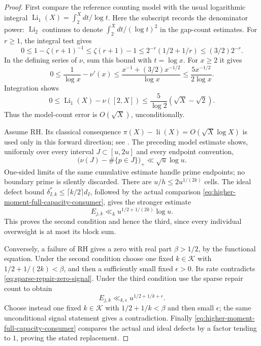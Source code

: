 \documentclass[11pt]{article}
\theoremstyle{definition}
\begin{document}
\begin{proof}
First compare the reference counting model with the usual
logarithmic integral $\operatorname{Li}_1(X)=\int_2^Xdt/\log t$.
Here the subscript records the denominator power: $\operatorname{Li}_2$
continues to denote $\int_2^Xdt/(\log t)^2$ in the gap-count estimates.
For $r\ge1$, the integral test gives
\[
 0\le1-\zeta(r+1)^{-1}
       \le\zeta(r+1)-1
       \le2^{-r}(1/2+1/r)\le(3/2)2^{-r}.
\]
In the defining series of $\nu$, sum this bound with
$t=\log x$. For $x\ge2$ it gives
\begin{equation}
 0\le\frac1{\log x}-\nu'(x)
       \le\frac{x^{-1}+(3/2)x^{-1/2}}{\log x}
       \le\frac{5x^{-1/2}}{2\log x}.
 \label{eq:continuous-model-logarithmic-integral-error}
\end{equation}
Integration shows
\[
 0\le\operatorname{Li}_1(X)-\nu([2,X])
       \le\frac5{\log2}(\sqrt X-\sqrt2).
\]
Thus the model-count error is $O(\sqrt X)$, unconditionally.

Assume RH. Its classical consequence
$\pi(X)-\operatorname{li}(X)=O(\sqrt X\log X)$ is used
only in this forward direction; see
\cite[Eq.~6.16.5]{DLMFPrimeError}.
The preceding model estimate shows, uniformly over every
interval $J\subset[u,2u]$ and every endpoint convention,
\[
 \bigl(\nu(J)-\#\{p\in J\}\bigr)_+
                                \ll\sqrt u\log u.
\]
One-sided limits of the same cumulative estimate handle
prime endpoints; no boundary prime is silently discarded.
There are $u/h\le2u^{1/(2k)}$ cells. The ideal defect bound
$\delta_{I,k}^*\le\lceil k/2\rceil d_I$, followed by the
actual comparison
\eqref{eq:higher-moment-full-capacity-consumer}, gives the
stronger estimate
\begin{equation}
 E_{j,k}\ll_k u^{1/2+1/(2k)}\log u.
 \label{eq:RH-implies-sparse-repair-rate}
\end{equation}
This proves the second condition and hence the third,
since every individual overweight is at most its block sum.

Conversely, a failure of RH gives a zero with real part
$\beta>1/2$, by the functional equation. Under the second
condition choose one fixed $k\in\mathcal K$ with
$1/2+1/(2k)<\beta$, and then a sufficiently small fixed
$\epsilon>0$. Its rate contradicts
\eqref{eq:sparse-repair-zero-signal}.
Under the third condition use the sparse repair count to
obtain
\[
 E_{j,k}\ll_{k,\epsilon}u^{1/2+1/k+\epsilon}.
\]
Choose instead one fixed $k\in\mathcal K$ with
$1/2+1/k<\beta$ and then small $\epsilon$; the same
unconditional signal statement gives a contradiction.
Finally \eqref{eq:higher-moment-full-capacity-consumer}
compares the actual and ideal defects by a factor tending
to $1$, proving the stated replacement.
\end{proof}
\end{document}
